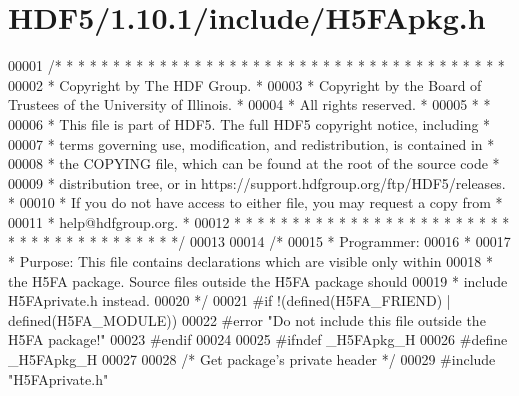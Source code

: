 \hypertarget{_h_d_f5_21_810_81_2include_2_h5_f_apkg_8h_source}{}\section{H\+D\+F5/1.10.1/include/\+H5\+F\+Apkg.h}
\label{_h_d_f5_21_810_81_2include_2_h5_f_apkg_8h_source}

\begin{DoxyCode}
00001 \textcolor{comment}{/* * * * * * * * * * * * * * * * * * * * * * * * * * * * * * * * * * * * * * *}
00002 \textcolor{comment}{ * Copyright by The HDF Group.                                               *}
00003 \textcolor{comment}{ * Copyright by the Board of Trustees of the University of Illinois.         *}
00004 \textcolor{comment}{ * All rights reserved.                                                      *}
00005 \textcolor{comment}{ *                                                                           *}
00006 \textcolor{comment}{ * This file is part of HDF5.  The full HDF5 copyright notice, including     *}
00007 \textcolor{comment}{ * terms governing use, modification, and redistribution, is contained in    *}
00008 \textcolor{comment}{ * the COPYING file, which can be found at the root of the source code       *}
00009 \textcolor{comment}{ * distribution tree, or in https://support.hdfgroup.org/ftp/HDF5/releases.  *}
00010 \textcolor{comment}{ * If you do not have access to either file, you may request a copy from     *}
00011 \textcolor{comment}{ * help@hdfgroup.org.                                                        *}
00012 \textcolor{comment}{ * * * * * * * * * * * * * * * * * * * * * * * * * * * * * * * * * * * * * * */}
00013 
00014 \textcolor{comment}{/*}
00015 \textcolor{comment}{ * Programmer:}
00016 \textcolor{comment}{ *}
00017 \textcolor{comment}{ * Purpose:    This file contains declarations which are visible only within}
00018 \textcolor{comment}{ *        the H5FA package.  Source files outside the H5FA package should}
00019 \textcolor{comment}{ *        include H5FAprivate.h instead.}
00020 \textcolor{comment}{ */}
00021 \textcolor{preprocessor}{#if !(defined(H5FA\_FRIEND) | defined(H5FA\_MODULE))}
00022 \textcolor{preprocessor}{#error "Do not include this file outside the H5FA package!"}
00023 \textcolor{preprocessor}{#endif}
00024 
00025 \textcolor{preprocessor}{#ifndef \_H5FApkg\_H}
00026 \textcolor{preprocessor}{#define \_H5FApkg\_H}
00027 
00028 \textcolor{comment}{/* Get package's private header */}
00029 \textcolor{preprocessor}{#include "H5FAprivate.h"}

\end{DoxyCode}
